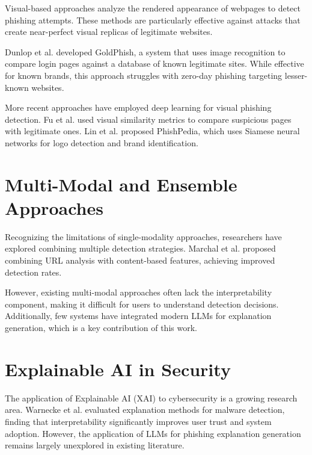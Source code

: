 \documentclass[12pt,a4paper]{report}
\begin{document}
Visual-based approaches analyze the rendered appearance of webpages to detect phishing attempts. These methods are particularly effective against attacks that create near-perfect visual replicas of legitimate websites.

Dunlop et al. \cite{dunlop2010goldphish} developed GoldPhish, a system that uses image recognition to compare login pages against a database of known legitimate sites. While effective for known brands, this approach struggles with zero-day phishing targeting lesser-known websites.

More recent approaches have employed deep learning for visual phishing detection. Fu et al. \cite{fu2006detecting} used visual similarity metrics to compare suspicious pages with legitimate ones. Lin et al. \cite{lin2019phishpedia} proposed PhishPedia, which uses Siamese neural networks for logo detection and brand identification.

\section{Multi-Modal and Ensemble Approaches}

Recognizing the limitations of single-modality approaches, researchers have explored combining multiple detection strategies. Marchal et al. \cite{marchal2017off} proposed combining URL analysis with content-based features, achieving improved detection rates.

However, existing multi-modal approaches often lack the interpretability component, making it difficult for users to understand detection decisions. Additionally, few systems have integrated modern LLMs for explanation generation, which is a key contribution of this work.

\section{Explainable AI in Security}

The application of Explainable AI (XAI) to cybersecurity is a growing research area. Warnecke et al. \cite{warnecke2020evaluating} evaluated explanation methods for malware detection, finding that interpretability significantly improves user trust and system adoption. However, the application of LLMs for phishing explanation generation remains largely unexplored in existing literature.

\end{document}
